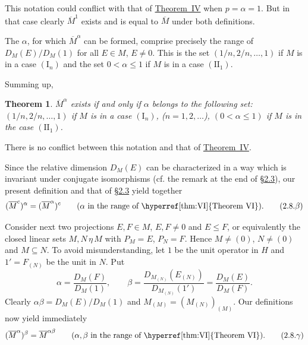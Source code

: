 \documentclass[b5paper,twoside]{article}
\newcommand{\secref}[2]{\hyperref[#1]{\mbox{\S#2}}}
\newcommand{\thmref}[2]{\hyperref[#1]{\mbox{Theorem~#2}}}
\theoremstyle{mvnplain}
\newtheorem{theorem}{Theorem}
\newcommand{\M}{\mathbf M}
\newcommand{\Hilbert}{\mathfrak H}
\def\M{M}%
\def\Hilbert{H}%
\def\mathfrak#1{#1}%
\begin{document}
This notation could conflict with that of \thmref{thm:IV}{IV} when
$p=\alpha=1$.  But in that case clearly $\overline{\M}^{1}$ exists and is
equal to $\overline{\M}$ under both definitions.

The $\alpha$, for which $\overline{\M}^{\alpha}$ can be formed, comprise
precisely the range of $D_{\M}(E)/D_{\M}(1)$ for all $E\in\M$, $E\ne0$.
This is the set $(1/n,2/n,\ldots,1)$ if $\M$ is in a case
$(\mathrm I_n)$ and the set $0<\alpha\leq1$ if $\M$ is in a case
$(\mathrm{II}_1)$.

Summing up,
\begin{theorem}\label{thm:VI}
$\overline{\M}^{\alpha}$ exists if and only if $\alpha$ belongs to the
following set: $(1/n,2/n,\ldots,1)$ if $\M$ is in a case $(\mathrm I_n)$,
($n=1,2,\ldots$), $(0<\alpha\leq1)$ if $\M$ is in the case
$(\mathrm{II}_1)$.
\end{theorem}
There is no conflict between this notation and that of \thmref{thm:IV}{IV}.

Since the relative dimension $D_{\M}(E)$ can be characterized in a way which
is invariant under conjugate isomorphisms (cf. the remark at the end of
\secref{sec:2.3}{2.3}), our present definition and that of
\secref{sec:2.3}{2.3} yield together
\begin{equation}
  (\overline{\M}^{c})^{\alpha}=(\overline{\M}^{\alpha})^{c}
  \qquad(\alpha\text{ in the range of \thmref{thm:VI}{VI}}).
  \tag{2.8.\ensuremath{\beta}}\label{eq:2.8.beta}
\end{equation}

Consider next two projections $E,F\in\M$, $E,F\ne0$ and $E\leq F$, or
equivalently the closed linear sets $\mathfrak M,\mathfrak N\,\eta\,\M$ with
$P_{\mathfrak M}=E$, $P_{\mathfrak N}=F$.  Hence
$\mathfrak M\ne(0)$, $\mathfrak N\ne(0)$ and
$\mathfrak M\subseteq\mathfrak N$.  To avoid misunderstanding, let $1$ be
the unit operator in $\Hilbert$ and $1'=F_{(\mathfrak N)}$ be the unit in
$\mathfrak N$.  Put
\[
  \alpha=\frac{D_{\M}(F)}{D_{\M}(1)},
  \qquad
  \beta=\frac{D_{\M_{(\mathfrak N)}}(E_{(\mathfrak N)})}
                   {D_{\M_{(\mathfrak N)}}(1')}
       =\frac{D_{\M}(E)}{D_{\M}(F)}.
\]
Clearly $\alpha\beta=D_{\M}(E)/D_{\M}(1)$ and
$\M_{(\mathfrak M)}=(\M_{(\mathfrak N)})_{(\mathfrak M)}$.  Our
definitions now yield immediately
\begin{equation}
  (\overline{\M}^{\alpha})^{\beta}=\overline{\M}^{\alpha\beta}
  \qquad(\alpha,\beta\text{ in the range of \thmref{thm:VI}{VI}}).
  \tag{2.8.\ensuremath{\gamma}}\label{eq:2.8.gamma}
\end{equation}
\end{document}
